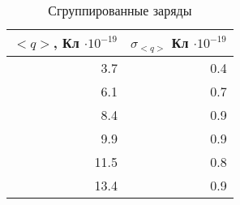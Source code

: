 \begin{table} 
\begin{center}
\label{table2}
 \caption{Сгруппированные заряды}
\begin{tabular}{|*{2}{r|}}
\hline 
$<q>$, Кл $\cdot 10^{-19}$ & $\sigma_{<q>}$ Кл $\cdot 10^{-19}$ \\ \hline 
3.7 & 0.4 \\ \hline 
 6.1 & 0.7 \\ \hline 
 8.4 & 0.9 \\ \hline 
 9.9 & 0.9 \\ \hline 
 11.5 & 0.8 \\ \hline 
 13.4 & 0.9 \\ \hline 
 \end{tabular}
 \end{center} 
\end{table} 
